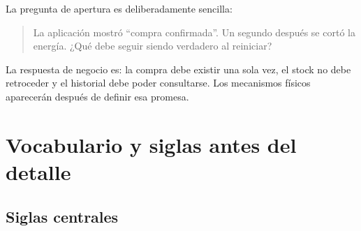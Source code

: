 \documentclass[variant=apuntes,cover=institutional,mode=screen]{ua-engineering-v6-article}
\begin{document}
La pregunta de apertura es deliberadamente sencilla:

\begin{quote}
La aplicación mostró ``compra confirmada''. Un segundo después se cortó la energía. ¿Qué debe seguir siendo verdadero al reiniciar?
\end{quote}

La respuesta de negocio es: la compra debe existir una sola vez, el stock no debe retroceder y el historial debe poder consultarse. Los mecanismos físicos aparecerán después de definir esa promesa.

\section{Vocabulario y siglas antes del detalle}

\subsection{Siglas centrales}
\end{document}
